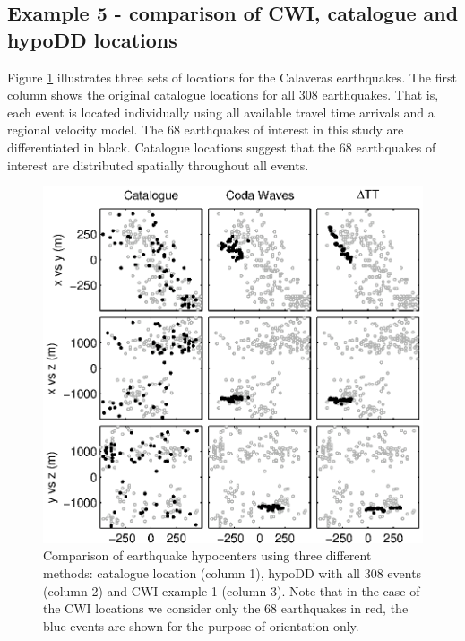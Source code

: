 \documentclass[extra]{gji}
\begin{document}
\subsection{Example 5 - comparison of CWI, catalogue and hypoDD locations}

Figure \ref{fig-69Calaverasevents_eg1} illustrates three sets of
locations for the Calaveras earthquakes. The first column shows the
original catalogue locations for all 308 earthquakes. That is, each event
is located individually using all available travel time arrivals and
a regional velocity model. The 68 earthquakes of interest in this
study are differentiated in black. Catalogue locations suggest that
the 68 earthquakes of interest are distributed spatially throughout
all events.


\begin{figure}
\includegraphics{diags/CalaverasLoc1_hypoDD_SVD.eps}
\caption{Comparison of earthquake hypocenters using three different
methods: catalogue location (column 1), hypoDD with all 308 events
(column 2) and CWI example 1 (column 3). Note that in the case of
the CWI locations we consider only the 68 earthquakes in red, the
blue events are shown for the purpose of orientation only.}
\label{fig-69Calaverasevents_eg1}
\end{figure}
\end{document}
